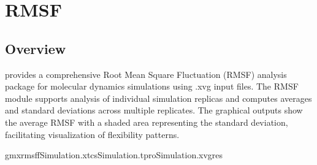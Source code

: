 \documentclass[a4paper,10pt,english]{sphinxmanual}
\begin{document}
\begin{sphinxVerbatim}[commandchars=\\\{\}]
   
     

  
  
\end{sphinxVerbatim}

\sphinxstepscope


\chapter{RMSF}
\label{\detokenize{RMSF:rmsf}}\label{\detokenize{RMSF::doc}}

\section{Overview}
\label{\detokenize{RMSF:overview}}
\sphinxAtStartPar
{} provides a comprehensive Root Mean Square Fluctuation (RMSF) analysis package for molecular dynamics simulations using .xvg input files. The RMSF module supports analysis of individual simulation replicas and computes averages and standard deviations across multiple replicates. The graphical outputs show the average RMSF with a shaded area representing the standard deviation, facilitating visualization of flexibility patterns.

\sphinxAtStartPar
{}

\begin{sphinxVerbatim}[commandchars=\\\{\}]
gmxrmsf\PYGZhy{}fSimulation.xtc\PYGZhy{}sSimulation.tpr\PYGZhy{}oSimulation.xvg\PYGZhy{}res
\end{sphinxVerbatim}

\begin{sphinxVerbatim}[commandchars=\\\{\}]
   
\end{sphinxVerbatim}
\end{document}
